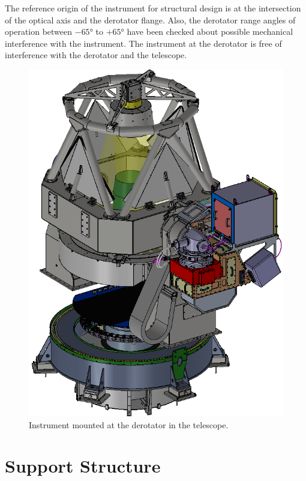 \documentclass{report}
\begin{document}
The reference origin of the instrument for structural design is at the intersection of the optical axis and the derotator flange. Also, the derotator range angles of operation between $-65$° to $+65$° have been checked about possible mechanical interference with the instrument. The instrument at the derotator is free of interference with the derotator and the telescope.

\begin{figure}
\begin{center}
\includegraphics[width=\linewidth]{figures/Telescope-DD-Cg-Optics-Mechanics-000.png}
\end{center}
\caption{Instrument mounted at the derotator in the telescope.}
\label{figure:telescopeC}
\end{figure}

\clearpage
\chapter{Support Structure}
\end{document}
